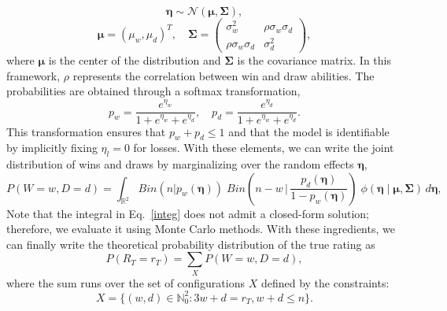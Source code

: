 \documentclass[preprint, amsmath,amssymb, pre]{revtex4-2}
\begin{document}
$$
\boldsymbol{\eta} \sim \mathcal{N}\left(\boldsymbol{\mu}, \boldsymbol{\Sigma} \right),
$$
%
$$
\boldsymbol{\mu} = ( \mu_w, \mu_d)^T,
\quad
\boldsymbol{\Sigma} =
\begin{pmatrix}
\sigma_w^2 & \rho \sigma_w \sigma_d \\
\rho \sigma_w \sigma_d & \sigma_d^2
\end{pmatrix},
$$
%
where $\boldsymbol{\mu}$ is the center of the distribution and $\boldsymbol{\Sigma}$ is the covariance matrix. In this framework, $\rho$ represents the correlation between win and draw abilities.
%
The probabilities are obtained through a softmax transformation,
%
$$
p_w = \frac{e^{\eta_w}}{1 + e^{\eta_w} + e^{\eta_d}}, \quad
p_d = \frac{e^{\eta_d}}{1 + e^{\eta_w} + e^{\eta_d}}.
$$
%
This transformation ensures that $p_w + p_d \leq 1$ and that the model is identifiable by implicitly fixing $\eta_l = 0$ for losses.
%
With these elements, we can write the joint distribution of wins and draws by marginalizing over the random effects $\boldsymbol{\eta}$,
%
\begin{equation} \label{integ}
P( W=w, D=d ) =
\int_{\mathbb{R}^2}
Bin( n | p_w(\boldsymbol{\eta}) )\;
Bin\!\left( n-w \,\bigg|\, \frac{p_d(\boldsymbol{\eta})}{1-p_w(\boldsymbol{\eta})} \right)\;
\phi( \boldsymbol{\eta} \mid \boldsymbol{\mu}, \boldsymbol{\Sigma} )
\, d \boldsymbol{\eta},
\end{equation}
%
Note that the integral in Eq.~\ref{integ} does not admit a closed-form solution; therefore, we evaluate it using Monte Carlo methods.
%
With these ingredients, we can finally write the theoretical probability distribution of the true rating as
%
\begin{equation} \label{theo}
P(R_T = r_T) = \sum_X P( W=w, D=d ),
\end{equation}
%
where the sum runs over the set of configurations $X$ defined by the constraints:
%
$$
X = \{ (w, d) \in \mathbb{N}_0^2 : 3w + d = r_T, w + d \le n \}.
$$
\end{document}
